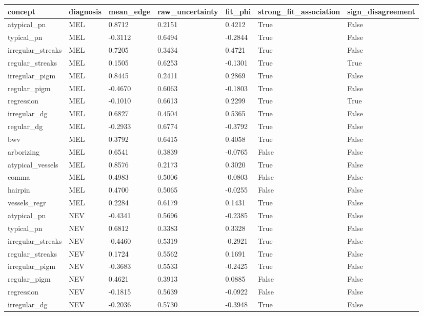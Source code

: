 \begin{tabular}{lllllll}
\hline
concept & diagnosis & mean\_edge & raw\_uncertainty & fit\_phi & strong\_fit\_association & sign\_disagreement \\
\hline
atypical\_pn & MEL & 0.8712 & 0.2151 & 0.4212 & True & False \\
typical\_pn & MEL & -0.3112 & 0.6494 & -0.2844 & True & False \\
irregular\_streaks & MEL & 0.7205 & 0.3434 & 0.4721 & True & False \\
regular\_streaks & MEL & 0.1505 & 0.6253 & -0.1301 & True & True \\
irregular\_pigm & MEL & 0.8445 & 0.2411 & 0.2869 & True & False \\
regular\_pigm & MEL & -0.4670 & 0.6063 & -0.1803 & True & False \\
regression & MEL & -0.1010 & 0.6613 & 0.2299 & True & True \\
irregular\_dg & MEL & 0.6827 & 0.4504 & 0.5365 & True & False \\
regular\_dg & MEL & -0.2933 & 0.6774 & -0.3792 & True & False \\
bwv & MEL & 0.3792 & 0.6415 & 0.4058 & True & False \\
arborizing & MEL & 0.6541 & 0.3839 & -0.0765 & False & False \\
atypical\_vessels & MEL & 0.8576 & 0.2173 & 0.3020 & True & False \\
comma & MEL & 0.4983 & 0.5006 & -0.0803 & False & False \\
hairpin & MEL & 0.4700 & 0.5065 & -0.0255 & False & False \\
vessels\_regr & MEL & 0.2284 & 0.6179 & 0.1431 & True & False \\
atypical\_pn & NEV & -0.4341 & 0.5696 & -0.2385 & True & False \\
typical\_pn & NEV & 0.6812 & 0.3383 & 0.3328 & True & False \\
irregular\_streaks & NEV & -0.4460 & 0.5319 & -0.2921 & True & False \\
regular\_streaks & NEV & 0.1724 & 0.5562 & 0.1691 & True & False \\
irregular\_pigm & NEV & -0.3683 & 0.5533 & -0.2425 & True & False \\
regular\_pigm & NEV & 0.4621 & 0.3913 & 0.0885 & False & False \\
regression & NEV & -0.1815 & 0.5639 & -0.0922 & False & False \\
irregular\_dg & NEV & -0.2036 & 0.5730 & -0.3948 & True & False \\

\end{tabular}
